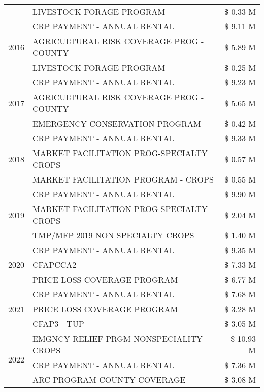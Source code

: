 \begin{tabular}{llr}
 & LIVESTOCK FORAGE PROGRAM & \$ 0.33 M \\
\cline{1-3}
\multirow[t]{3}{*}{2016} & CRP PAYMENT - ANNUAL RENTAL & \$ 9.11 M \\
 & AGRICULTURAL RISK COVERAGE PROG - COUNTY & \$ 5.89 M \\
 & LIVESTOCK FORAGE PROGRAM & \$ 0.25 M \\
\cline{1-3}
\multirow[t]{3}{*}{2017} & CRP PAYMENT - ANNUAL RENTAL & \$ 9.23 M \\
 & AGRICULTURAL RISK COVERAGE PROG - COUNTY & \$ 5.65 M \\
 & EMERGENCY CONSERVATION PROGRAM & \$ 0.42 M \\
\cline{1-3}
\multirow[t]{3}{*}{2018} & CRP PAYMENT - ANNUAL RENTAL & \$ 9.33 M \\
 & MARKET FACILITATION PROG-SPECIALTY CROPS & \$ 0.57 M \\
 & MARKET FACILITATION PROGRAM - CROPS & \$ 0.55 M \\
\cline{1-3}
\multirow[t]{3}{*}{2019} & CRP PAYMENT - ANNUAL RENTAL & \$ 9.90 M \\
 & MARKET FACILITATION PROG-SPECIALTY CROPS & \$ 2.04 M \\
 & TMP/MFP 2019 NON SPECIALTY CROPS & \$ 1.40 M \\
\cline{1-3}
\multirow[t]{3}{*}{2020} & CRP PAYMENT - ANNUAL RENTAL & \$ 9.35 M \\
 & CFAPCCA2 & \$ 7.33 M \\
 & PRICE LOSS COVERAGE PROGRAM & \$ 6.77 M \\
\cline{1-3}
\multirow[t]{3}{*}{2021} & CRP PAYMENT - ANNUAL RENTAL & \$ 7.68 M \\
 & PRICE LOSS COVERAGE PROGRAM & \$ 3.28 M \\
 & CFAP3 - TUP & \$ 3.05 M \\
\cline{1-3}
\multirow[t]{3}{*}{2022} & EMGNCY RELIEF PRGM-NONSPECIALITY CROPS & \$ 10.93 M \\
 & CRP PAYMENT - ANNUAL RENTAL & \$ 7.36 M \\
 & ARC PROGRAM-COUNTY COVERAGE & \$ 3.08 M \\
\cline{1-3}
\bottomrule
\end{tabular}
